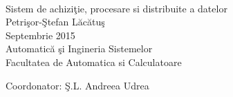 \documentclass[a4paper,12pt, oneside, titlepage]{book}
\begin{document}
\pagestyle{empty}    
\begingroup
{}


\begin{titlepage}
\thispagestyle{empty}

\mbox{}\\[6pc]
\begin{center}
	\Huge{Sistem de achiziţie, procesare si distribuite a datelor}\\[2pc]
	
	\Large{Petrişor-Ştefan Lăcătuş}\\[1pc]
	\large{Septembrie 2015}\\[2pc]
	
	Automatică şi Ingineria Sistemelor\\
Facultatea de Automatica si Calculatoare
\end{center}
\vfill

\noindent Coordonator: Ş.L. Andreea Udrea

\end{titlepage}


\tableofcontents 

\endgroup %

\clearpage
\pagestyle{plain}      



 

 

 



  

\printbibliography[heading=bibintoc, title={Bibliografie}]
\end{document}
